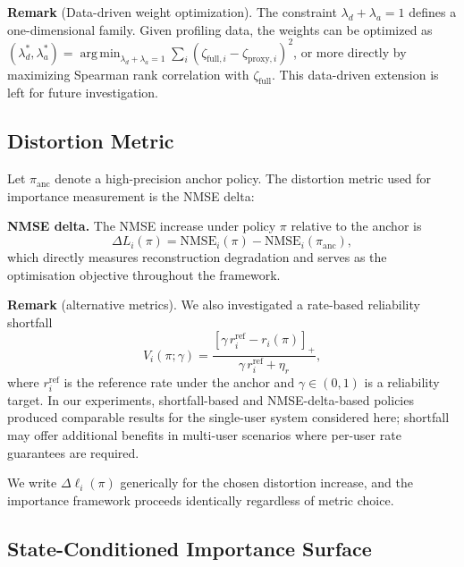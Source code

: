 \documentclass[conference]{IEEEtran}
\DeclareMathOperator*{\argmin}{arg\,min}
\begin{document}
\textbf{Remark} (Data-driven weight optimization).
The constraint $\lambda_d + \lambda_a = 1$ defines a one-dimensional family.
Given profiling data, the weights can be optimized as
$(\lambda_d^*, \lambda_a^*) = \argmin_{\lambda_d + \lambda_a = 1} \sum_{i}(\zeta_{\mathrm{full},i} - \zeta_{\mathrm{proxy},i})^2$,
or more directly by maximizing Spearman rank correlation with $\zeta_{\mathrm{full}}$.
This data-driven extension is left for future investigation.

\subsection{Distortion Metric}
\label{subsec:shortfall}

Let $\pi_{\mathrm{anc}}$ denote a high-precision anchor policy.
The distortion metric used for importance measurement is the NMSE delta:

\textbf{NMSE delta.}
The NMSE increase under policy $\pi$ relative to the anchor is
\begin{equation}
\Delta L_i(\pi) = \mathrm{NMSE}_i(\pi) - \mathrm{NMSE}_i(\pi_{\mathrm{anc}}),
\label{eq:nmse_delta}
\end{equation}
which directly measures reconstruction degradation and serves as the optimisation objective throughout the framework.

\textbf{Remark} (alternative metrics).
We also investigated a rate-based reliability shortfall
\begin{equation}
V_i(\pi;\gamma) = \frac{[\gamma\, r_i^{\mathrm{ref}} - r_i(\pi)]_+}{\gamma\, r_i^{\mathrm{ref}} + \eta_r},
\label{eq:shortfall}
\end{equation}
where $r_i^{\mathrm{ref}}$ is the reference rate under the anchor and $\gamma\in(0,1)$ is a reliability target.
In our experiments, shortfall-based and NMSE-delta-based policies produced comparable results for the single-user system considered here; shortfall may offer additional benefits in multi-user scenarios where per-user rate guarantees are required.

We write $\Delta\ell_i(\pi)$ generically for the chosen distortion increase, and the importance framework proceeds identically regardless of metric choice.

\subsection{State-Conditioned Importance Surface}
\label{subsec:importance_surface}
\end{document}
